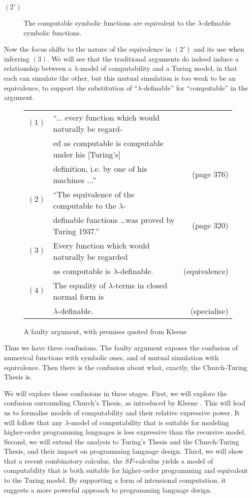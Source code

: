 \documentclass[a4paper]{article}
\begin{document}
\begin{description}
\item[$(2')$]   The computable symbolic functions are equivalent to
the $\lambda$-definable symbolic functions.
\end{description}

\noindent 
Now the focus shifts to the nature of the equivalence in $(2')$ and
its use when inferring $(3)$.  We will see that the traditional
arguments do indeed induce a relationship between a $\lambda$-model of
computability and a Turing model, in that each can simulate the other,
but this mutual simulation is too weak to be an equivalence, to support
the substitution of ``$\lambda$-definable'' for ``computable'' in the argument. 



\begin{figure}
\begin{tabular}{rlr}
$(1)$ &
 ``... every function which would naturally be
  regard- \\ & ed as computable is computable under his [Turing's] \\ &  definition, i.e. by
  one of his machines ...'' & (page 376) \\
$(2)$ &  ``The equivalence of the computable to the $\lambda$-\\ &  definable functions \ldots was proved by Turing 1937.'' & (page 320) \\
$(3)$ &
  Every function which would naturally be regarded  \\ & as computable is $\lambda$-definable. &(equivalence) \\
$(4)$ &
The equality of  $\lambda$-terms in closed normal form is \\ & $\lambda$-definable. &(specialise) 
\end{tabular}
\caption{A faulty argument, with premises quoted from Kleene \cite{Kleene52}}
\label{fig:faulty}
\end{figure}

Thus we have three confusions. The faulty argument exposes the
confusion of numerical functions with symbolic ones, and of mutual
simulation with equivalence. Then there is the confusion about what,
exactly, the Church-Turing Thesis is.

We will explore these confusions in three stages.  First, we will
explore the confusion surrounding Church's Thesis, as introduced by
Kleene \cite{Kleene52}. This will lead us to formalise models of
computability and their relative expressive power. It will follow that
any $\lambda$-model of computability that is suitable for modeling
higher-order programming languages is less expressive than the
recursive model.  Second, we will extend the analysis to Turing's
Thesis and the Church-Turing Thesis, and their impact on programming
language design.  Third, we will show that a recent combinatory
calculus, the $SF$-calculus \cite{JGW11} yields a model of
computability that is both suitable for higher-order programming and
equivalent to the Turing model.  By supporting a form of intensional
computation, it suggests a more powerful approach to programming
language design.
\end{document}
